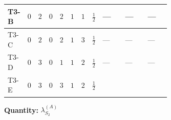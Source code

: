 \documentclass[8pt]{article}
\begin{document}
\begin{landscape}
\begin{longtable}{@{}llcccccc >{\raggedright\arraybackslash}p{0.21\linewidth} >{\raggedright\arraybackslash}p{0.21\linewidth} >{\raggedright\arraybackslash}p{0.21\linewidth}@{}}
\midrule
T3-B & $0$ & $2$ & $0$ & $2$ & $1$ & $1$ & $\frac{1}{2}$ & --- & --- & --- \\
\midrule
T3-C & $0$ & $2$ & $0$ & $2$ & $1$ & $3$ & $\frac{1}{2}$ & --- & --- & --- \\
\midrule
T3-D & $0$ & $3$ & $0$ & $1$ & $1$ & $2$ & $\frac{1}{2}$ & --- & --- & --- \\
\midrule
T3-E & $0$ & $3$ & $0$ & $3$ & $1$ & $2$ & $\frac{1}{2}$ & \scriptsize\adjustbox{max width=\linewidth}{$\begin{gathered} \frac{3 {g_2}^4}{4}\end{gathered}$} & \scriptsize\adjustbox{max width=\linewidth}{$\begin{gathered} +{g_1}^2 \left(9 {g_2}^2-\frac{3 {\lambda_{S_2}^{(1)}}}{2}-12 {\lambda_{S_2}^{(A)}}\right)\end{gathered}$} & \scriptsize\adjustbox{max width=\linewidth}{$\begin{gathered} +{g_2}^2 (-3 {\lambda_{S_2}^{(1)}}-24 {\lambda_{S_2}^{(A)}})\end{gathered}$} \\
\midrule
\bottomrule
\end{longtable}
\clearpage
\noindent\textbf{Quantity: }$\lambda_{S_2}^{(A)}$\par\smallskip

\end{landscape}
\end{document}
